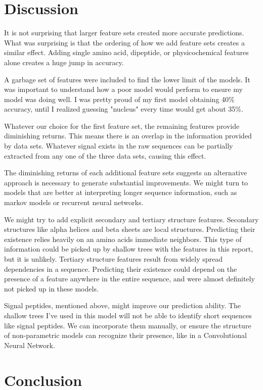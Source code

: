 \documentclass{bioinfo}
\begin{document}
\section{Discussion}

It is not surprising that larger feature sets created more accurate predictions.
What was surprising is that the ordering of how we add feature sets creates a similar effect.
Adding single amino acid, dipeptide, or physicochemical features alone creates a huge jump in accuracy.

A garbage set of features were included to find the lower limit of the models.
It was important to understand how a poor model would perform to ensure my model was doing well.
I was pretty proud of my first model obtaining 40\% accuracy, until I realized guessing "nucleus" every time would get about 35\%.

Whatever our choice for the first feature set, the remaining features provide diminishing returns.
This means there is an overlap in the information provided by data sets.
Whatever signal exists in the raw sequences can be partially extracted from any one of the three data sets, causing this effect.

The diminishing returns of each additional feature sets suggests an alternative approach is necessary to generate substantial improvements.
We might turn to models that are better at interpreting longer sequence information, such as markov models or recurrent neural networks.

We might try to add explicit secondary and tertiary structure features.
Secondary structures like alpha helices and beta sheets are local structures.
Predicting their existence relies heavily on an amino acids immediate neighbors.
This type of information could be picked up by shallow trees with the features in this report, but it is unlikely.
Tertiary structure features result from widely spread dependencies in a sequence.
Predicting their existence could depend on the presence of a feature anywhere in the entire sequence, and were almost definitely not picked up in these models.

Signal peptides, mentioned above, might improve our prediction ability.
The shallow trees I've used in this model will not be able to identify short sequences like signal peptides.
We can incorporate them manually, or ensure the structure of non-parametric models can recognize their presence, like in a Convolutional Neural Network.

\section{Conclusion}
\end{document}
